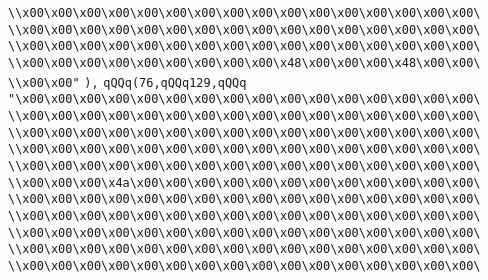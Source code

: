 \verb|\\x00\x00\x00\x00\x00\x00\x00\x00\x00\x00\x00\x00\x00\x00\x00\x00\|\newline
\verb|\\x00\x00\x00\x00\x00\x00\x00\x00\x00\x00\x00\x00\x00\x00\x00\x00\|\newline
\verb|\\x00\x00\x00\x00\x00\x00\x00\x00\x00\x00\x00\x00\x00\x00\x00\x00\|\newline
\verb|\\x00\x00\x00\x00\x00\x00\x00\x00\x00\x48\x00\x00\x00\x48\x00\x00\|\newline
\verb|\\x00\x00"|\newline
\verb|),|\newline
\verb|qQQq(76,qQQq129,qQQq|\newline
\verb|"\x00\x00\x00\x00\x00\x00\x00\x00\x00\x00\x00\x00\x00\x00\x00\x00\|\newline
\verb|\\x00\x00\x00\x00\x00\x00\x00\x00\x00\x00\x00\x00\x00\x00\x00\x00\|\newline
\verb|\\x00\x00\x00\x00\x00\x00\x00\x00\x00\x00\x00\x00\x00\x00\x00\x00\|\newline
\verb|\\x00\x00\x00\x00\x00\x00\x00\x00\x00\x00\x00\x00\x00\x00\x00\x00\|\newline
\verb|\\x00\x00\x00\x00\x00\x00\x00\x00\x00\x00\x00\x00\x00\x00\x00\x00\|\newline
\verb|\\x00\x00\x00\x4a\x00\x00\x00\x00\x00\x00\x00\x00\x00\x00\x00\x00\|\newline
\verb|\\x00\x00\x00\x00\x00\x00\x00\x00\x00\x00\x00\x00\x00\x00\x00\x00\|\newline
\verb|\\x00\x00\x00\x00\x00\x00\x00\x00\x00\x00\x00\x00\x00\x00\x00\x00\|\newline
\verb|\\x00\x00\x00\x00\x00\x00\x00\x00\x00\x00\x00\x00\x00\x00\x00\x00\|\newline
\verb|\\x00\x00\x00\x00\x00\x00\x00\x00\x00\x00\x00\x00\x00\x00\x00\x00\|\newline
\verb|\\x00\x00\x00\x00\x00\x00\x00\x00\x00\x00\x00\x00\x00\x00\x00\x00\|\newline
